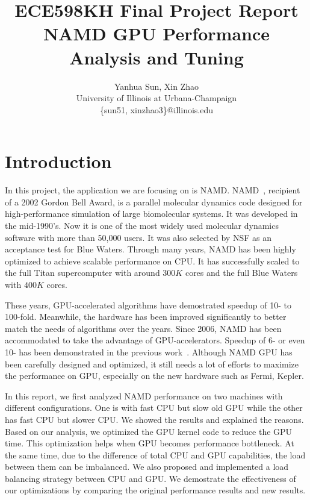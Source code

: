\documentclass[11pt,onecolumn]{article}
\begin{document}

\title{ ECE598KH Final Project Report \\ NAMD GPU Performance Analysis and Tuning}

\author{
  Yanhua Sun, Xin Zhao\\
  University of Illinois at Urbana-Champaign\\
  \{sun51, xinzhao3\}@illinois.edu
}

\date{}
\maketitle

\lstset{
  basicstyle=\ttfamily,
  showstringspaces=false
}

%
%

\section{Introduction}
In this project, the application we are focusing on is NAMD.
NAMD~\cite{NamdSC02}, recipient of a 2002 Gordon Bell Award, is a parallel molecular 
dynamics code designed for high-performance simulation of large biomolecular systems.
It was developed in the mid-1990's. Now it is one of the most widely used molecular dynamics 
software with more than 50,000 users. It was also selected by NSF as an acceptance test
for Blue Waters.
Through many years, NAMD has been highly optimized to achieve scalable performance on CPU.
It has successfully scaled to the full Titan supercomputer with around $300K$ cores and 
the full Blue Waters with $400K$ cores.

These years, GPU-accelerated algorithms have demostrated speedup of 10- to 100-fold. Meanwhile, 
the hardware has been improved significantly to better match the needs of algorithms over the years.
Since 2006, NAMD has been accommodated to take the advantage of GPU-accelerators. Speedup of 
6- or even 10- has been demonstrated in the previous work~\cite{phillips_stone_namd_cuda}.
Although NAMD GPU has been carefully designed and optimized, it still needs a lot of 
efforts to maximize the performance on GPU, especially on the new hardware such as Fermi, Kepler. 

In this report, we first analyzed NAMD performance on two machines with different configurations.
One is with fast CPU but slow old GPU while the other has fast CPU but slower CPU. We showed 
the results and explained the reasons. Based on our analysis, we optimized the GPU kernel code
to reduce the GPU time. This optimization helps when GPU becomes performance bottleneck.
At the same time, due to the difference of total CPU and GPU capabilities, the load between them
can be imbalanced. We also proposed and implemented a load balancing strategy between CPU and GPU.
We demostrate the effectiveness of our optimizations by comparing the original performance results
and new results.
\end{document}
